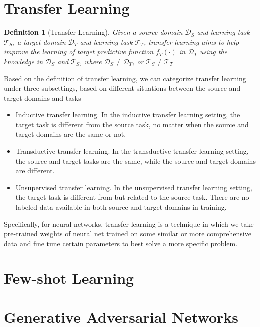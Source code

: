 \documentclass{article}
\newtheorem{definition}{Definition}
\begin{document}
\section{Transfer Learning} 

\begin{definition}[Transfer Learning]
Given a source domain $\mathcal{D}_S$ and learning task $\mathcal{T}_S$, a target domain $\mathcal{D}_T$ and learning task $\mathcal{T}_T$, transfer learning aims to help improve the learning of target predictive function $f_T(\cdot)$ in $\mathcal{D}_T$ using the knowledge in $\mathcal{D}_S$ and $\mathcal{T}_S$, where $\mathcal{D}_S\neq \mathcal{D}_T$, or $\mathcal{T}_S\neq \mathcal{T}_T$
\end{definition}

Based on the definition of transfer learning, we can categorize transfer learning under three subsettings, based on different situations between the source and target domains and tasks \cite{pan2010survey}
\begin{itemize}
\item Inductive transfer learning. In the inductive transfer learning setting, the target task is different from the source task, no matter when the source and target domains are the same or not.
\item Transductive transfer learning. In the transductive transfer learning setting, the source and target tasks are the same, while the source and target domains are different.
\item Unsupervised transfer learning. In the unsupervised transfer learning setting, the target task is different from but related to the source task. There are no labeled data available in both source and target domains in training.
\end{itemize}


Specifically, for neural networks, transfer learning is a technique in which we take pre-trained weights of neural net trained on some similar or more comprehensive data and fine tune certain parameters to best solve a more specific problem.

\section{Few-shot Learning}

\section{Generative Adversarial Networks}
\end{document}
